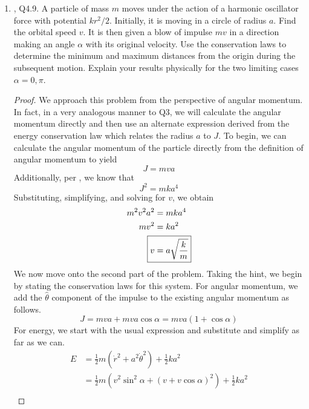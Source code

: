 \documentclass[../psets.tex]{subfiles}
\begin{document}
\begin{enumerate}
    \item \textcite{bib:KibbleBerkshire}, Q4.9. A particle of mass $m$ moves under the action of a harmonic oscillator force with potential $kr^2/2$. Initially, it is moving in a circle of radius $a$. Find the orbital speed $v$. It is then given a blow of impulse $mv$ in a direction making an angle $\alpha$ with its original velocity. Use the conservation laws to determine the minimum and maximum distances from the origin during the subsequent motion. Explain your results physically for the two limiting cases $\alpha=0,\pi$.
    \begin{proof}
        We approach this problem from the perspective of angular momentum. In fact, in a very analogous manner to Q3, we will calculate the angular momentum directly and then use an alternate expression derived from the energy conservation law which relates the radius $a$ to $J$. To begin, we can calculate the angular momentum of the particle directly from the definition of angular momentum to yield
        \begin{equation*}
            J = mva
        \end{equation*}
        Additionally, per \textcite[78]{bib:KibbleBerkshire}, we know that
        \begin{equation*}
            J^2 = mka^4
        \end{equation*}
        Substituting, simplifying, and solving for $v$, we obtain
        \begin{align*}
            m^2v^2a^2 &= mka^4\\
            mv^2 &= ka^2\\
            \Aboxed{v &= a\sqrt{\frac{k}{m}}}
        \end{align*}
        We now move onto the second part of the problem. Taking the hint, we begin by stating the conservation laws for this system. For angular momentum, we add the $\hat{\theta}$ component of the impulse to the existing angular momentum as follows.
        \begin{equation*}
            J = mva+mva\cos\alpha
            = mva(1+\cos\alpha)
        \end{equation*}
        For energy, we start with the usual expression and substitute and simplify as far as we can.
        \begin{align*}
            E &= \frac{1}{2}m(\dot{r}^2+a^2\dot{\theta}^2)+\frac{1}{2}ka^2\\
            &= \frac{1}{2}m(v^2\sin^2\alpha+(v+v\cos\alpha)^2)+\frac{1}{2}ka^2\\

\end{align*}
\end{proof}
\end{enumerate}
\end{document}
